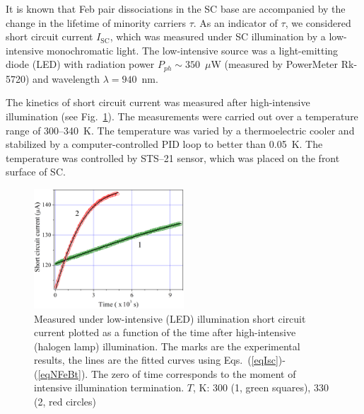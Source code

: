 \documentclass[sn-mathphys]{sn-jnl}%
\theoremstyle{thmstyleone}%
\theoremstyle{thmstyletwo}%
\theoremstyle{thmstylethree}%
\begin{document}
It is known that Feb pair dissociations in the SC base are accompanied by the change
in the lifetime of minority carriers $\tau$.
As an indicator of $\tau$, we considered short circuit current $I_\mathrm{SC}$,
which was measured under SC illumination by a low-intensive monochromatic light.
The low-intensive source was a light-emitting diode (LED) with radiation
power $P_{ph}\sim350$~$\mu$W (measured by PowerMeter Rk-5720) and
wavelength $\lambda=940$~nm.

The kinetics of short circuit current was measured after high-intensive illumination
(see Fig.~\ref{figIsc}).
The measurements were carried out over a temperature range
of 300--340~K.
The temperature was varied by a thermoelectric cooler and stabilized by a
computer-controlled PID loop to better than 0.05~K.
The temperature was controlled by STS--21 sensor, which was placed on the front surface of SC.


\begin{figure}
\centering
\includegraphics[width=0.5\textwidth]{Fig2}
\caption{
Measured under low-intensive (LED) illumination short circuit current
 plotted as a function of the time after high-intensive (halogen lamp) illumination.
The marks are the experimental results, the lines are the fitted curves using Eqs.~(\ref{eqIsc})-(\ref{eqNFeBt}).
The zero of time corresponds to the moment of intensive illumination termination.
$T$, K: 300 (1, green squares), 330 (2, red circles)}
\label{figIsc}       %
\end{figure}
\end{document}
